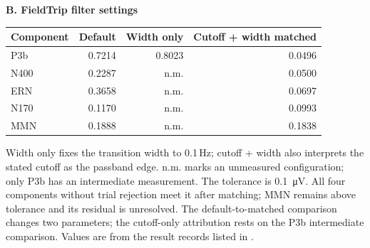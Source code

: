\begin{table}[!htbp]
\par\medskip
\textbf{B. FieldTrip filter settings}\par\smallskip
\begin{tabular}{lrrr}
\toprule
Component & Default & Width only & Cutoff + width matched \\
\midrule
P3b & 0.7214 & 0.8023 & 0.0496 \\
N400 & 0.2287 & n.m. & 0.0500 \\
ERN & 0.3658 & n.m. & 0.0697 \\
N170 & 0.1170 & n.m. & 0.0993 \\
MMN & 0.1888 & n.m. & 0.1838 \\
\bottomrule
\end{tabular}
\par\smallskip
\begin{minipage}{\linewidth}\footnotesize
Width only fixes the transition width to 0.1\,Hz; cutoff + width also interprets the stated cutoff as the passband edge. n.m. marks an unmeasured configuration; only P3b has an intermediate measurement. The tolerance is \SI{0.1}{\uV}. All four components without trial rejection meet it after matching; MMN remains above tolerance and its residual is unresolved. The default-to-matched comparison changes two parameters; the cutoff-only attribution rests on the P3b intermediate comparison. Values are from the result records listed in .
\end{minipage}
\end{table}

